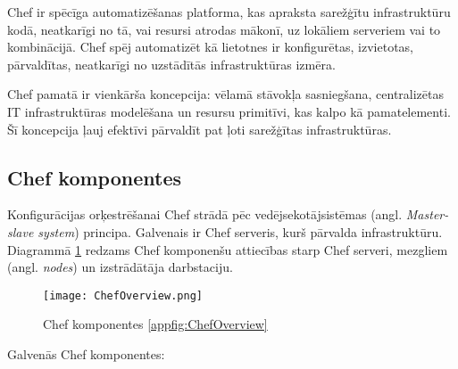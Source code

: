 Chef ir spēcīga automatizēšanas platforma, kas apraksta sarežģītu infrastruktūru kodā, neatkarīgi no tā, vai resursi atrodas mākonī, uz lokāliem serveriem vai to kombinācijā. Chef spēj automatizēt kā lietotnes ir konfigurētas, izvietotas, pārvaldītas, neatkarīgi no uzstādītās infrastruktūras izmēra.

Chef pamatā ir vienkārša koncepcija: vēlamā stāvokļa sasniegšana, centralizētas IT infrastruktūras modelēšana un resursu primitīvi, kas kalpo kā pamatelementi. Šī koncepcija ļauj efektīvi pārvaldīt pat ļoti sarežģītas infrastruktūras. \cite[Getting Started]{chef-docs}
\subsection{Chef komponentes}
Konfigurācijas orķestrēšanai Chef strādā pēc vedējsekotājsistēmas (angl. \textit{Master-slave system}) principa. Galvenais ir Chef serveris, kurš pārvalda infrastruktūru.
Diagrammā \ref{fig:ChefOverview} redzams Chef komponenšu attiecības starp Chef serveri, mezgliem (angl. \textit{nodes}) un izstrādātāja darbstaciju. \cite[Overview]{chef-docs}
\begin{figure}[H]%
	\centering
	\captionsetup{justification=centering}
	\texttt{[image: ChefOverview.png]}
	\caption{Chef komponentes \ref{appfig:ChefOverview}}
	\label{fig:ChefOverview}
\end{figure}
Galvenās Chef komponentes:
